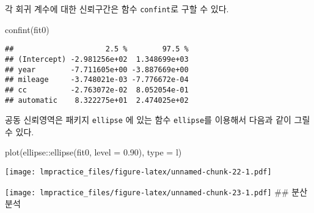 \documentclass[
]{book}
\newenvironment{Shaded}{\begin{snugshade}}{\end{snugshade}}
\newcommand{\AttributeTok}[1]{\textcolor[rgb]{0.77,0.63,0.00}{#1}}
\newcommand{\FloatTok}[1]{\textcolor[rgb]{0.00,0.00,0.81}{#1}}
\newcommand{\FunctionTok}[1]{\textcolor[rgb]{0.00,0.00,0.00}{#1}}
\newcommand{\NormalTok}[1]{#1}
\newcommand{\SpecialCharTok}[1]{\textcolor[rgb]{0.00,0.00,0.00}{#1}}
\newcommand{\StringTok}[1]{\textcolor[rgb]{0.31,0.60,0.02}{#1}}
\begin{document}
각 회귀 계수에 대한 신뢰구간은 함수 \texttt{confint}로 구할 수 있다.

\begin{Shaded}
\begin{Highlighting}[]
\FunctionTok{confint}\NormalTok{(fit0)}
\end{Highlighting}
\end{Shaded}

\begin{verbatim}
##                     2.5 %        97.5 %
## (Intercept) -2.981256e+02  1.348699e+03
## year        -7.711605e+00 -3.887669e+00
## mileage     -3.748021e-03 -7.776672e-04
## cc          -2.763072e-02  8.052054e-01
## automatic    8.322275e+01  2.474025e+02
\end{verbatim}

공동 신뢰영역은 패키지 \texttt{ellipse} 에 있는 함수 \texttt{ellipse}를 이용해서 다음과 같이 그릴 수 있다.

\begin{Shaded}
\begin{Highlighting}[]
\FunctionTok{plot}\NormalTok{(ellipse}\SpecialCharTok{::}\FunctionTok{ellipse}\NormalTok{(fit0, }\AttributeTok{level =} \FloatTok{0.90}\NormalTok{), }\AttributeTok{type =} \StringTok{\textquotesingle{}l\textquotesingle{}}\NormalTok{)}
\end{Highlighting}
\end{Shaded}

\texttt{[image: lmpractice\_files/figure-latex/unnamed-chunk-22-1.pdf]}

\begin{Shaded}
\end{Shaded}

\texttt{[image: lmpractice\_files/figure-latex/unnamed-chunk-23-1.pdf]}
\#\# 분산분석
\end{document}
